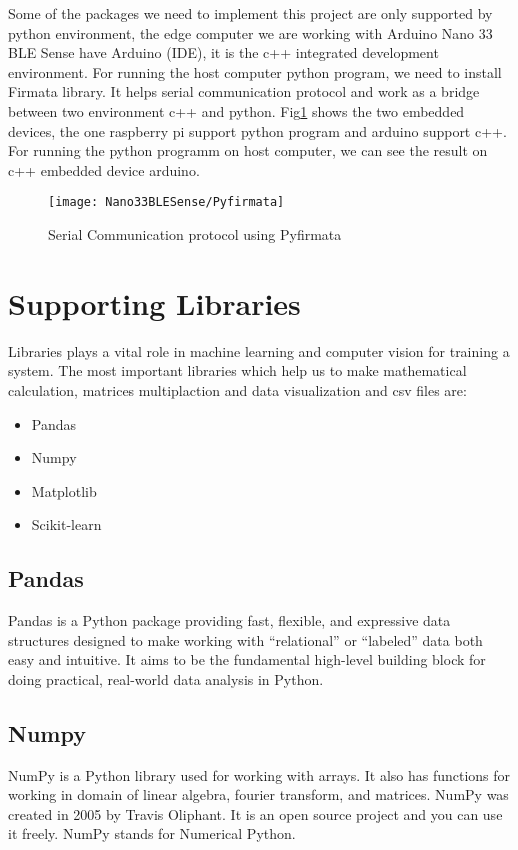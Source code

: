 Some of the packages we need to implement this project are only supported by python environment, the edge computer we are working with Arduino Nano 33 BLE Sense have Arduino (IDE), it is the c++ integrated development environment. For running the host computer python program, we need to install Firmata library. It helps serial communication protocol and work as a bridge between two environment c++ and python. Fig\ref{Serial Communication protocol using Pyfirmata} shows the two embedded devices, the one raspberry pi support python program and arduino support c++. For running the python programm on host computer, we can see the result on c++ embedded device arduino. 
\begin{figure}[h]
	\centering
	\texttt{[image: Nano33BLESense/Pyfirmata]}
	\caption{Serial Communication protocol using Pyfirmata}
	\label{Serial Communication protocol using Pyfirmata}
\end{figure}
\section {Supporting Libraries}
Libraries plays a vital role in machine learning and computer vision for training a system. The most important libraries which help us to make mathematical calculation, matrices multiplaction and data visualization and csv files are:
\begin{itemize}
	\item Pandas
	\item Numpy
	\item Matplotlib
	\item Scikit-learn
\end{itemize}
\subsection{Pandas}
Pandas is a Python package providing fast, flexible, and expressive data structures designed to make working with “relational” or “labeled” data both easy and intuitive. It aims to be the fundamental high-level building block for doing practical, real-world data analysis in Python.
\subsection{Numpy}
NumPy is a Python library used for working with arrays. It also has functions for working in domain of linear algebra, fourier transform, and matrices. NumPy was created in 2005 by Travis Oliphant. It is an open source project and you can use it freely. NumPy stands for Numerical Python.
